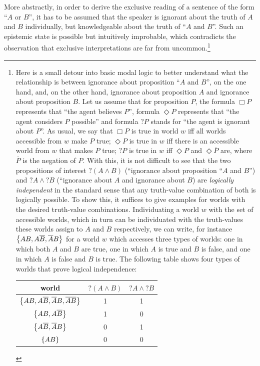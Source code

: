 \documentclass[12pt]{article}
\begin{document}
More abstractly, in order to derive the exclusive reading of a sentence of the form ``$A$ or
$B$'', it has to be assumed that the speaker is ignorant about the truth of $A$ and $B$
individually, but knowledgeable about the truth of ``$A$ and $B$''. Such an epistemic state is
possible but intuitively improbable, which contradicts the observation that exclusive
interpretations are far from uncommon.\footnote{Here is a small detour into basic modal logic
  to better understand what the relationship is between ignorance about proposition ``$A$ and
  $B$'', on the one hand, and, on the other hand, ignorance about proposition $A$ and ignorance
  about proposition $B$. Let us assume that for proposition $P$, the formula $\Box P$
  represents that ``the agent believes $P$'', formula $\Diamond P$ represents that ``the agent
  considers $P$ possible'' and formula ?$P$ stands for ``the agent is ignorant about $P$''. As
  usual, we say that $\Box P$ is true in world $w$ iff all worlds accessible from $w$ make $P$
  true; $\Diamond P$ is true in $w$ iff there is an accessible world from $w$ that makes $P$
  true; $?P$ is true in $w$ iff $\Diamond P$ and $\Diamond \overline{P}$ are, where
  $\overline{P}$ is the negation of $P$. With this, it is not difficult to see that the two
  propositions of interest $?(A \wedge B)$ (``ignorance about proposition ``$A$ and $B$'') and
  $?A \wedge ?B$ (``ignorance about $A$ and ignorance about $B$) are \emph{logically
    independent} in the standard sense that any truth-value combination of both is logically
  possible. To show this, it suffices to give examples for worlds with the desired
  truth-value combinations. Individuating a world $w$ with the set of accessible worlds, which
  in turn can be individuated with the truth-values these worlds assign to $A$ and $B$
  respectively, we can write, for instance $\left\{AB, A\overline{B}, \overline{A}B\right\}$ for a world
  $w$ which accesses three types of worlds: one in which both $A$ and $B$ are true, one in
  which $A$ is true and $B$ is false, and one in which $A$ is false and $B$ is true. The
  following table shows four types of worlds that prove logical independence:
\begin{center}
  \begin{tabular}{ccc}
    world & $?(A \wedge B)$ & $?A \wedge ?B$ \\ \midrule 
    $\left\{AB, A\overline{B}, \overline{A}B, \overline{A}\overline{B}\right\}$ & 1 & 1\\
    $\left\{AB, A\overline{B}\right\}$ & 1 & 0 \\
    $\left\{A\overline{B}, \overline{A}B\right\}$ & 0 & 1 \\
    $\left\{AB\right\}$ & 0 & 0 \\
  \end{tabular}
\end{center}
}
\end{document}
